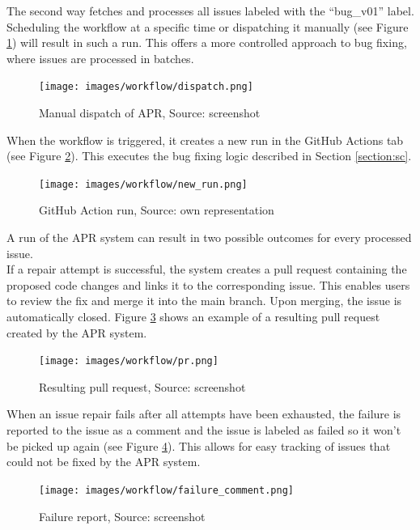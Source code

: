 The second way fetches and processes all issues labeled with the ``bug\_v01'' label. Scheduling the workflow at a specific time or dispatching it manually (see Figure \ref{fig:dispatch}) will result in such a run. This offers a more controlled approach to bug fixing, where issues are processed in batches.

\begin{figure}[H]
    \centering
    \texttt{[image: images/workflow/dispatch.png]}
    \caption{Manual dispatch of APR, Source: screenshot}
    \label{fig:dispatch}
\end{figure}

When the workflow is triggered, it creates a new run in the GitHub Actions tab (see Figure \ref{fig:apr-action}). This executes the bug fixing logic described in Section \ref{section:sc}.


\begin{figure}[H]
    \centering
    \texttt{[image: images/workflow/new\_run.png]}
    \caption{GitHub Action run, Source: own representation}
    \label{fig:apr-action}
\end{figure}

A run of the APR system can result in two possible outcomes for every processed issue. \\
If a repair attempt is successful, the system creates a pull request containing the proposed code changes and links it to the corresponding issue. This enables users to review the fix and merge it into the main branch. Upon merging, the issue is automatically closed.
Figure \ref{fig:pr} shows an example of a resulting pull request created by the APR system.

\begin{figure}[H]
    \centering
    \texttt{[image: images/workflow/pr.png]}
    \caption{Resulting pull request, Source: screenshot}
    \label{fig:pr}
\end{figure}

When an issue repair fails after all attempts have been exhausted, the failure is reported to the issue as a comment and the issue is labeled as failed so it won't be picked up again (see Figure \ref{fig:failure-report}). This allows for easy tracking of issues that could not be fixed by the APR system.

\begin{figure}[H]
    \centering
    \texttt{[image: images/workflow/failure\_comment.png]}
    \caption{Failure report, Source: screenshot}
    \label{fig:failure-report}
\end{figure}

